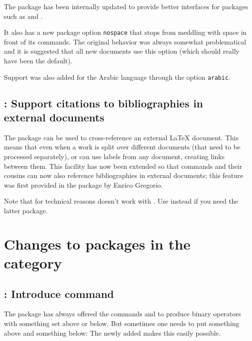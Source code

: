 \documentclass{ltnews}
\providecommand\option[1]{\texttt{#1}}
\begin{document}
The  package has been internally updated to provide
better interfaces for packages such as  and
.

It also
has a new package option \option{nospace} that stops
 from meddling with space in front of
its commands. The
original behavior was always somewhat problematical and it is
suggested that
all new documents
use this option (which
should really have been the default).

Support was also added for the Arabic language through the option
\option{arabic}.




\subsection[\pkg{xr}: Support citations to bibliographies in\\ external documents]
{: Support citations to bibliographies in external documents}

The  package can be used to cross-reference an external \LaTeX{}
document.
This means that even when a work is split over different documents (that
need to be processed separately),  or  can use labels from
any document, creating links between them. This facility has now been extended
so that  commands and
their cousins can now also reference bibliographies in external
documents; this feature was first provided in the package
 by Enrico Gregorio.

Note that for technical reasons  doesn't work with
. Use  instead if you need the latter
package.


\section{Changes to packages in the  category}

\subsection{: Introduce  command}

The  package has always offered
the commands  and
 to produce binary operators with something set above or
below. But sometimes one needs to put something above and something below:
The newly added  makes this
easily possible.
\end{document}

